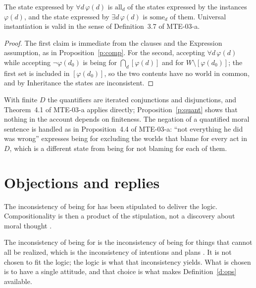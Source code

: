\documentclass{situationist-preprint}
\begin{document}
\begin{proposition}\label{p:quant}
The state expressed by $\forall d\,\varphi(d)$ is $\mathrm{all}_{d}$ of the states expressed by the instances $\varphi(d)$, and the state expressed by $\exists d\,\varphi(d)$ is $\mathrm{some}_{d}$ of them. Universal instantiation is valid in the sense of Definition~3.7 of MTE-03-a.
\end{proposition}

\begin{proof}
The first claim is immediate from the clauses and the Expression assumption, as in Proposition~\ref{p:comp}. For the second, accepting $\forall d\,\varphi(d)$ while accepting $\neg\varphi(d_0)$ is being for $\bigcap_d[\varphi(d)]$ and for $W\setminus[\varphi(d_0)]$; the first set is included in $[\varphi(d_0)]$, so the two contents have no world in common, and by Inheritance the states are inconsistent.
\end{proof}

With finite $D$ the quantifiers are iterated conjunctions and disjunctions, and Theorem~4.1 of MTE-03-a applies directly; Proposition~\ref{p:quant} shows that nothing in the account depends on finiteness. The negation of a quantified moral sentence is handled as in Proposition~4.4 of MTE-03-a: \enquote{not everything he did was wrong} expresses being for excluding the worlds that blame for every act in $D$, which is a different state from being for not blaming for each of them.

\section{Objections and replies}\label{s:obj}

\begin{objection}
The inconsistency of being for has been stipulated to deliver the logic. Compositionality is then a product of the stipulation, not a discovery about moral thought \citep{Schroeder2008}.
\end{objection}

\begin{reply}
The inconsistency of being for is the inconsistency of being for things that cannot all be realized, which is the inconsistency of intentions and plans \citep{Gibbard2003}. It is not chosen to fit the logic; the logic is what that inconsistency yields. What is chosen is to have a single attitude, and that choice is what makes Definition~\ref{d:ops} available.
\end{reply}
\end{document}
